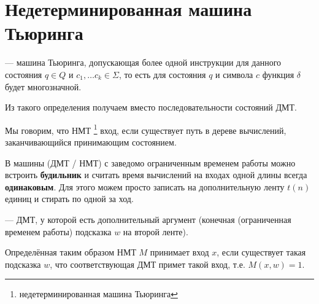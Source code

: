\section{Недетерминированная машина Тьюринга}
\begin{defn} 
	 --- машина Тьюринга, допускающая более одной инструкции для данного состояния $ q \in Q$ и $ c_1, \ldots c_k \in \Sigma $, то есть для состояния  $ q $ и символа $ c$ функция  $ \delta $ будет многозначной.
\end{defn}

Из такого определения получаем  вместо последовательности состояний ДМТ.

Мы говорим, что НМТ \footnote{недетерминированная машина Тьюринга}  вход, если существует путь в дереве вычислений, \\ заканчивающийся принимающим состоянием.

\begin{st}
	В машины (ДМТ / НМТ) с заведомо ограниченным временем работы можно встроить \textbf{будильник} и считать время вычислений на входах одной длины всегда \textbf{одинаковым}.
	Для этого можем просто записать на дополнительную ленту $ t(n)$ единиц и стирать по одной за ход. 
\end{st}

\begin{defn}
	 --- ДМТ, у которой есть дополнительный аргумент (конечная (ограниченная временем работы) подсказка $ w$ на второй ленте).
\end{defn}

Определённая таким образом НМТ $ M $ принимает вход $ x $, если существует такая подсказка $ w $, что соответствующая ДМТ примет такой вход, т.е. $ M(x, w) = 1 $.


